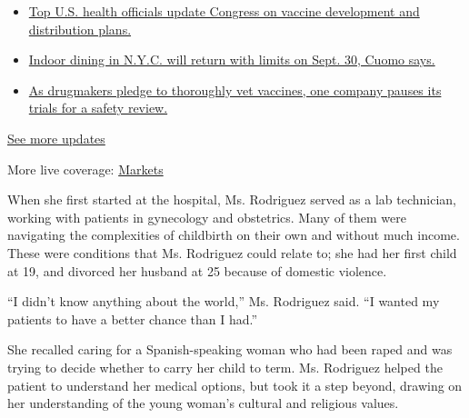 \begin{itemize}
\tightlist
\item
  \href{https://www.nytimes3xbfgragh.onion/2020/09/09/world/covid-19-coronavirus.html?action=click\&pgtype=Article\&state=default\&region=MAIN_CONTENT_1\&context=storylines_live_updates\#link-279e24e2}{Top
  U.S. health officials update Congress on vaccine development and
  distribution plans.}
\item
  \href{https://www.nytimes3xbfgragh.onion/2020/09/09/world/covid-19-coronavirus.html?action=click\&pgtype=Article\&state=default\&region=MAIN_CONTENT_1\&context=storylines_live_updates\#link-792ae257}{Indoor
  dining in N.Y.C. will return with limits on Sept. 30, Cuomo says.}
\item
  \href{https://www.nytimes3xbfgragh.onion/2020/09/09/world/covid-19-coronavirus.html?action=click\&pgtype=Article\&state=default\&region=MAIN_CONTENT_1\&context=storylines_live_updates\#link-5b0bf0d1}{As
  drugmakers pledge to thoroughly vet vaccines, one company pauses its
  trials for a safety review.}
\end{itemize}

\href{https://www.nytimes3xbfgragh.onion/2020/09/09/world/covid-19-coronavirus.html?action=click\&pgtype=Article\&state=default\&region=MAIN_CONTENT_1\&context=storylines_live_updates}{See
more updates}

More live coverage:
\href{https://www.nytimes3xbfgragh.onion/live/2020/09/09/business/stock-market-today-coronavirus?action=click\&pgtype=Article\&state=default\&region=MAIN_CONTENT_1\&context=storylines_live_updates}{Markets}

When she first started at the hospital, Ms. Rodriguez served as a lab
technician, working with patients in gynecology and obstetrics. Many of
them were navigating the complexities of childbirth on their own and
without much income. These were conditions that Ms. Rodriguez could
relate to; she had her first child at 19, and divorced her husband at 25
because of domestic violence.

``I didn't know anything about the world,'' Ms. Rodriguez said. ``I
wanted my patients to have a better chance than I had.''

She recalled caring for a Spanish-speaking woman who had been raped and
was trying to decide whether to carry her child to term. Ms. Rodriguez
helped the patient to understand her medical options, but took it a step
beyond, drawing on her understanding of the young woman's cultural and
religious values.

